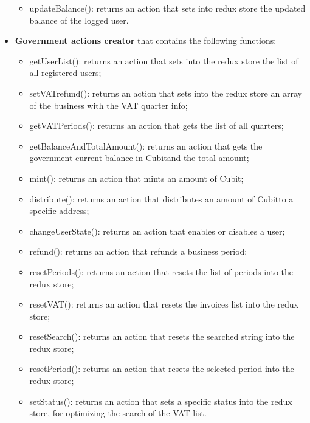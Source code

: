 \begin{itemize}
\begin{itemize}
		\item updateBalance(): returns an action that sets into redux store the updated balance of the logged user.
	\end{itemize}
	\item \textbf{Government actions creator} that contains the following functions:
	\begin{itemize}
		\item getUserList(): returns an action that sets into the redux store the list of all registered users;
		\item setVATrefund(): returns an action that sets into the redux store an array of the business with the VAT quarter info;
		\item getVATPeriods(): returns an action that gets the list of all quarters;
		\item getBalanceAndTotalAmount(): returns an action that gets the government current balance in Cubit\glosp and the total amount;
		\item mint(): returns an action that mints an amount of Cubit\glo;
		\item distribute(): returns an action that distributes an amount of Cubit\glosp to a specific address;
		\item changeUserState(): returns an action that enables or disables a user;
		\item refund(): returns an action that refunds a business period;
		\item resetPeriods(): returns an action that resets the list of periods into the redux store;
		\item resetVAT(): returns an action that resets the invoices list into the redux store;
		\item resetSearch(): returns an action that resets the searched string into the redux store;
		\item resetPeriod(): returns an action that resets the selected period into the redux store;
		\item setStatus(): returns an action that sets a specific status into the redux store, for optimizing the search of the VAT list.
	\end{itemize}
\end{itemize}
